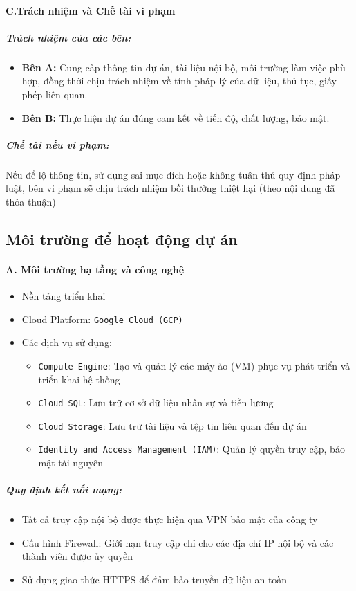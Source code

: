 \paragraph{C.Trách nhiệm và Chế tài vi phạm}
\subparagraph{Trách nhiệm của các bên:}
\begin{itemize}
    \item \textbf{Bên A:} Cung cấp thông tin dự án, tài liệu nội bộ, môi trường làm việc phù hợp, đồng thời chịu trách nhiệm về tính pháp lý của dữ liệu, thủ tục, giấy phép liên quan.
    
    \item \textbf{Bên B:} Thực hiện dự án đúng cam kết về tiến độ, chất lượng, bảo mật.
\end{itemize}

\subparagraph{Chế tài nếu vi phạm:}
Nếu để lộ thông tin, sử dụng sai mục đích hoặc không tuân thủ quy định pháp luật, bên vi phạm sẽ chịu trách nhiệm bồi thường thiệt hại (theo nội dung đã thỏa thuận)

\subsection{Môi trường để hoạt động dự án}

\paragraph{A. Môi trường hạ tầng và công nghệ}
\begin{itemize}
    \item Nền tảng triển khai
    \item Cloud Platform: \texttt{Google Cloud (GCP)}
    \item Các dịch vụ sử dụng:
    \begin{itemize}
        \item \texttt{Compute Engine}: Tạo và quản lý các máy ảo (VM) phục vụ phát triển và triển khai hệ thống
        \item \texttt{Cloud SQL}: Lưu trữ cơ sở dữ liệu nhân sự và tiền lương
        \item \texttt{Cloud Storage}: Lưu trữ tài liệu và tệp tin liên quan đến dự án
        \item \texttt{Identity and Access Management (IAM)}: Quản lý quyền truy cập, bảo mật tài nguyên
    \end{itemize}
\end{itemize}

\subparagraph{Quy định kết nối mạng:}
\begin{itemize}
    \item Tất cả truy cập nội bộ được thực hiện qua VPN bảo mật của công ty
    \item Cấu hình Firewall: Giới hạn truy cập chỉ cho các địa chỉ IP nội bộ và các thành viên được ủy quyền
    \item Sử dụng giao thức HTTPS để đảm bảo truyền dữ liệu an toàn
\end{itemize}


